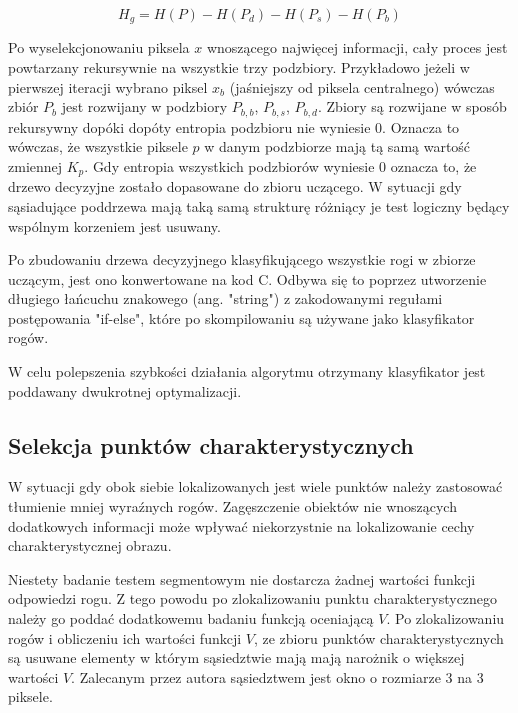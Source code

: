 \begin{equation}
H_g = H(P) - H(P_d) - H(P_s) - H(P_b)
\end{equation}

Po wyselekcjonowaniu piksela $x$ wnoszącego najwięcej informacji, cały proces jest powtarzany rekursywnie na wszystkie trzy podzbiory. Przykładowo jeżeli w pierwszej iteracji wybrano piksel $x_b$ (jaśniejszy od piksela centralnego) wówczas zbiór $P_{b}$ jest rozwijany w podzbiory $P_{b,b}$, $P_{b,s}$, $P_{b,d}$. Zbiory są rozwijane w sposób rekursywny dopóki dopóty entropia podzbioru nie wyniesie 0. Oznacza to wówczas, że wszystkie piksele $p$ w danym podzbiorze mają tą samą wartość zmiennej $K_p$. Gdy entropia wszystkich podzbiorów wyniesie 0 oznacza to, że drzewo decyzyjne zostało dopasowane do zbioru uczącego. W sytuacji gdy sąsiadujące poddrzewa mają taką samą strukturę różniący je test logiczny będący wspólnym korzeniem jest usuwany.

Po zbudowaniu drzewa decyzyjnego klasyfikującego wszystkie rogi w zbiorze uczącym, jest ono konwertowane na kod C. Odbywa się to poprzez utworzenie długiego łańcuchu znakowego (ang. "string") z zakodowanymi regułami postępowania "if-else", które po skompilowaniu są używane jako klasyfikator rogów. 

W celu polepszenia szybkości działania algorytmu otrzymany klasyfikator jest poddawany dwukrotnej optymalizacji. 





\subsection{Selekcja punktów charakterystycznych}

W sytuacji gdy obok siebie lokalizowanych jest wiele punktów należy zastosować tłumienie mniej wyraźnych rogów. Zagęszczenie obiektów nie wnoszących dodatkowych informacji może wpływać niekorzystnie na lokalizowanie cechy charakterystycznej obrazu. 

Niestety badanie testem segmentowym nie dostarcza żadnej wartości funkcji odpowiedzi rogu. Z tego powodu po zlokalizowaniu punktu charakterystycznego należy go poddać dodatkowemu badaniu funkcją oceniającą $V$. Po zlokalizowaniu rogów i obliczeniu ich wartości funkcji $V$, ze zbioru punktów charakterystycznych są usuwane elementy w którym sąsiedztwie mają mają narożnik o większej wartości $V$. Zalecanym przez autora sąsiedztwem jest okno o rozmiarze 3 na 3 piksele.

